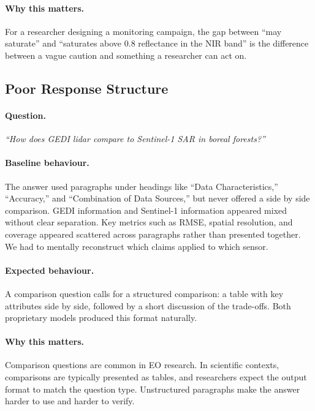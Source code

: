 \paragraph{Why this matters.} For a researcher designing a monitoring campaign, the gap between ``may saturate'' and ``saturates above 0.8 reflectance in the NIR band'' is the difference between a vague caution and something a researcher can act on.

\subsection{Poor Response Structure}
\label{subsec:poor-structure-example}

\paragraph{Question.} \textit{``How does GEDI lidar compare to Sentinel-1 SAR in boreal forests?''}

\paragraph{Baseline behaviour.} The answer used paragraphs under headings like ``Data Characteristics,'' ``Accuracy,'' and ``Combination of Data Sources,'' but never offered a side by side comparison. GEDI information and Sentinel-1 information appeared mixed without clear separation. Key metrics such as RMSE, spatial resolution, and coverage appeared scattered across paragraphs rather than presented together. We had to mentally reconstruct which claims applied to which sensor.

\paragraph{Expected behaviour.} A comparison question calls for a structured comparison: a table with key attributes side by side, followed by a short discussion of the trade-offs. Both proprietary models produced this format naturally.

\paragraph{Why this matters.} Comparison questions are common in EO research. In scientific contexts, comparisons are typically presented as tables, and researchers expect the output format to match the question type. Unstructured paragraphs make the answer harder to use and harder to verify.

